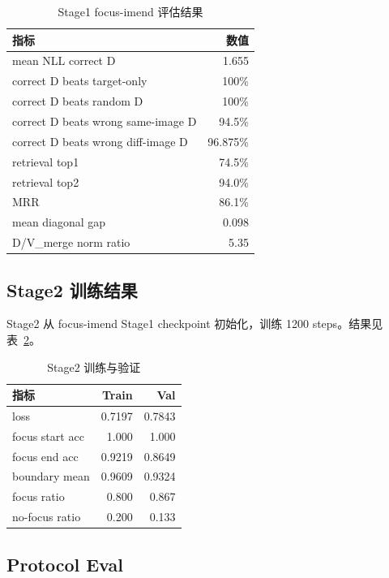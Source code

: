 \documentclass[10pt,twocolumn]{ctexart}
\begin{document}
\begin{table}[h]
\centering
\small
\caption{Stage1 focus-imend 评估结果}
\label{tab:stage1}
\begin{tabular}{lr}
\toprule
指标 & 数值 \\
\midrule
mean NLL correct D & 1.655 \\
correct D beats target-only & 100\% \\
correct D beats random D & 100\% \\
correct D beats wrong same-image D & 94.5\% \\
correct D beats wrong diff-image D & 96.875\% \\
retrieval top1 & 74.5\% \\
retrieval top2 & 94.0\% \\
MRR & 86.1\% \\
mean diagonal gap & 0.098 \\
D/V\_merge norm ratio & 5.35 \\
\bottomrule
\end{tabular}
\end{table}

\subsection{Stage2 训练结果}

Stage2 从 focus-imend Stage1 checkpoint 初始化，训练 1200 steps。结果见表~\ref{tab:stage2-train}。

\begin{table}[h]
\centering
\small
\caption{Stage2 训练与验证}
\label{tab:stage2-train}
\begin{tabular}{lrr}
\toprule
指标 & Train & Val \\
\midrule
loss & 0.7197 & 0.7843 \\
focus start acc & 1.000 & 1.000 \\
focus end acc & 0.9219 & 0.8649 \\
boundary mean & 0.9609 & 0.9324 \\
focus ratio & 0.800 & 0.867 \\
no-focus ratio & 0.200 & 0.133 \\
\bottomrule
\end{tabular}
\end{table}

\subsection{Protocol Eval}
\end{document}
